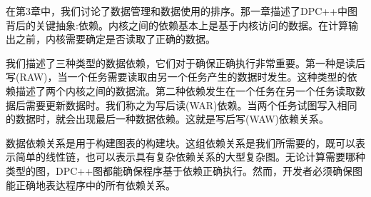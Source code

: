 在第3章中，我们讨论了数据管理和数据使用的排序。那一章描述了DPC++中图背后的关键抽象:依赖。内核之间的依赖基本上是基于内核访问的数据。在计算输出之前，内核需要确定是否读取了正确的数据。\par

我们描述了三种类型的数据依赖，它们对于确保正确执行非常重要。第一种是读后写(RAW)，当一个任务需要读取由另一个任务产生的数据时发生。这种类型的依赖描述了两个内核之间的数据流。第二种依赖发生在一个任务在另一个任务读取数据后需要更新数据时。我们称之为写后读(WAR)依赖。当两个任务试图写入相同的数据时，就会出现最后一种数据依赖。这就是写后写(WAW)依赖关系。\par

数据依赖关系是用于构建图表的构建块。这组依赖关系是我们所需要的，既可以表示简单的线性链，也可以表示具有复杂依赖关系的大型复杂图。无论计算需要哪种类型的图，DPC++图都能确保程序基于依赖正确执行。然而，开发者必须确保图能正确地表达程序中的所有依赖关系。\par